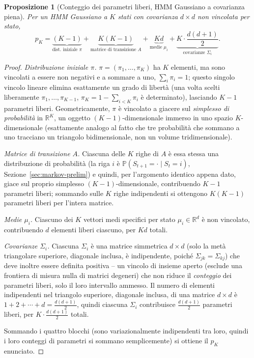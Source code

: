 \documentclass[11pt]{article}
\newtheorem{proposition}[theorem]{Proposizione}
\theoremstyle{definition}
\theoremstyle{remark}
\begin{document}
\begin{proposition}[Conteggio dei parametri liberi, HMM Gaussiano a covarianza piena]
Per un HMM Gaussiano a $K$ stati con covarianza $d\times d$ non vincolata per stato,
\[
p_K = \underbrace{(K-1)}_{\text{dist.\ iniziale }\pi} + \underbrace{K(K-1)}_{\text{matrice di transizione }A} + \underbrace{Kd}_{\text{medie }\mu_i} + \underbrace{K\cdot\frac{d(d+1)}{2}}_{\text{covarianze }\Sigma_i}.
\]
\end{proposition}
\begin{proof}
\emph{Distribuzione iniziale $\pi$.} $\pi=(\pi_1,\dots,\pi_K)$ ha $K$ elementi, ma sono vincolati a essere non negativi e a sommare a uno, $\sum_i\pi_i=1$; questo singolo vincolo lineare elimina esattamente un grado di libert\`a (una volta scelti liberamente $\pi_1,\dots,\pi_{K-1}$, $\pi_K=1-\sum_{i<K}\pi_i$ \`e determinato), lasciando $K-1$ parametri liberi. Geometricamente, $\pi$ \`e vincolato a giacere sul \emph{simplesso di probabilit\`a} in $\mathbb{R}^K$, un oggetto $(K-1)$-dimensionale immerso in uno spazio $K$-dimensionale (esattamente analogo al fatto che tre probabilit\`a che sommano a uno tracciano un triangolo bidimensionale, non un volume tridimensionale).

\emph{Matrice di transizione $A$.} Ciascuna delle $K$ righe di $A$ \`e essa stessa una distribuzione di probabilit\`a (la riga $i$ \`e $\mathbb{P}(S_{t+1}=\cdot\mid S_t=i)$, Sezione~\ref{sec:markov-prelim}) e quindi, per l'argomento identico appena dato, giace sul proprio simplesso $(K-1)$-dimensionale, contribuendo $K-1$ parametri liberi; sommando sulle $K$ righe indipendenti si ottengono $K(K-1)$ parametri liberi per l'intera matrice.

\emph{Medie $\mu_i$.} Ciascuno dei $K$ vettori medi specifici per stato $\mu_i\in\mathbb{R}^d$ \`e non vincolato, contribuendo $d$ elementi liberi ciascuno, per $Kd$ totali.

\emph{Covarianze $\Sigma_i$.} Ciascuna $\Sigma_i$ \`e una matrice simmetrica $d\times d$ (solo la met\`a triangolare superiore, diagonale inclusa, \`e indipendente, poich\'e $\Sigma_{jk}=\Sigma_{kj}$) che deve inoltre essere definita positiva -- un vincolo di insieme aperto (esclude una frontiera di misura nulla di matrici degeneri) che non riduce il \emph{conteggio} dei parametri liberi, solo il loro intervallo ammesso. Il numero di elementi indipendenti nel triangolo superiore, diagonale inclusa, di una matrice $d\times d$ \`e $1+2+\cdots+d=\frac{d(d+1)}{2}$, quindi ciascuna $\Sigma_i$ contribuisce $\frac{d(d+1)}{2}$ parametri liberi, per $K\cdot\frac{d(d+1)}{2}$ totali.

Sommando i quattro blocchi (sono variazionalmente indipendenti tra loro, quindi i loro conteggi di parametri si sommano semplicemente) si ottiene il $p_K$ enunciato.
\end{proof}
\end{document}
